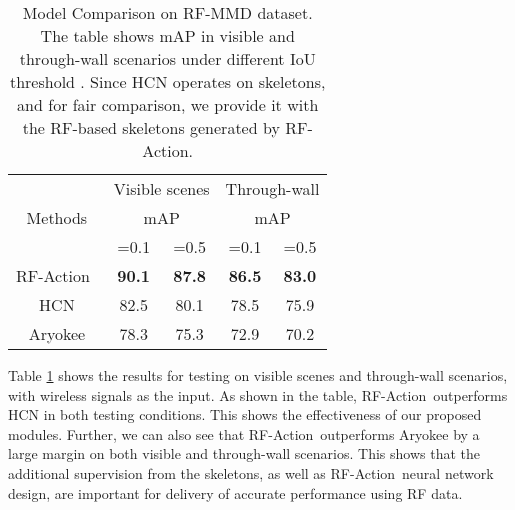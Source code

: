 \documentclass[10pt,twocolumn,letterpaper]{article}
\newcommand{\name} {RF-Action}
\begin{document}
\begin{table}[htbp]
  \small
    \centering
    \vspace{-5pt}
    \begin{tabular}{ccccc}
        \hline
        \multirow{3}{*}{Methods} & \multicolumn{2}{c}{Visible scenes} & \multicolumn{2}{c}{Through-wall}\\ \cmidrule(lr){2-3} \cmidrule(lr){4-5}
        & \multicolumn{2}{c}{mAP} & \multicolumn{2}{c}{mAP}\\ 
        & =0.1 & =0.5 & =0.1 & =0.5 \\
        \hline
        \name\ & \textbf{90.1} & \textbf{87.8} & \textbf{86.5} & \textbf{83.0}\\
        HCN \cite{li2018co} & 82.5 & 80.1 & 78.5 & 75.9  \\
        Aryokee \cite{tian2018rf} & 78.3 & 75.3 & 72.9 & 70.2 \\
        \hline
    \end{tabular}
  \vspace{-10pt}
    \caption{\footnotesize{Model Comparison on RF-MMD dataset. The table shows mAP in visible and through-wall scenarios under different IoU threshold . Since HCN operates on skeletons, and for fair comparison, we provide it with the RF-based skeletons generated by \name.}    }
  \vspace{-10pt}
  \label{tab:ap_main}
\end{table}


 Table \ref{tab:ap_main} shows the results for testing on visible scenes and through-wall scenarios, with wireless signals as the input.  As shown in the table, \name\ outperforms HCN in both testing conditions. This shows the effectiveness of our proposed modules. Further, we can also see that \name\ outperforms Aryokee by a large margin on both visible and through-wall scenarios. This shows that the additional supervision from the skeletons, as well as \name\ neural network design, are important for delivery of accurate performance using RF data. 
\end{document}
